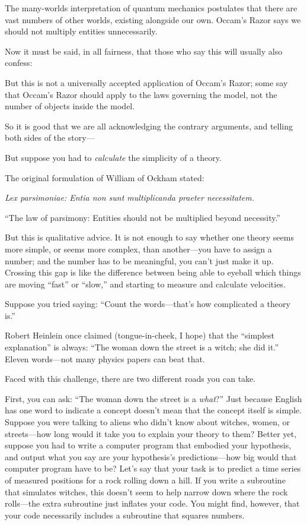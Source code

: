 {
 The many-worlds interpretation of quantum mechanics postulates
that there are vast numbers of other worlds, existing alongside our
own. Occam's Razor says we should not multiply entities
unnecessarily.}

{
 Now it must be said, in all fairness, that those who say this will
usually also confess:}

{
 But this is not a universally accepted application of
Occam's Razor; some say that Occam's
Razor should apply to the laws governing the model, not the number of
objects inside the model.}

{
 So it is good that we are all acknowledging the contrary
arguments, and telling both sides of the story---}

{
 But suppose you had to \textit{calculate} the simplicity of a
theory.}

{
 The original formulation of William of Ockham stated:}

{
 \textit{Lex parsimoniae: Entia non sunt multiplicanda praeter
necessitatem.}}

{
 ``The law of parsimony: Entities should not be
multiplied beyond necessity.''}

{
 But this is qualitative advice. It is not enough to say whether
one theory seems more simple, or seems more complex, than another---you
have to assign a number; and the number has to be meaningful, you
can't just make it up. Crossing this gap is like the
difference between being able to eyeball which things are moving
``fast'' or
``slow,'' and starting to measure
and calculate velocities.}

{
 Suppose you tried saying: ``Count the
words---that's how complicated a theory
is.''}

{
 Robert Heinlein once claimed (tongue-in-cheek, I hope) that the
``simplest explanation'' is always:
``The woman down the street is a witch; she did
it.'' Eleven words---not many physics papers can beat
that.}

{
 Faced with this challenge, there are two different roads you can
take.}

{
 First, you can ask: ``The woman down the street
is a \textit{what}?'' Just because English has one
word to indicate a concept doesn't mean that the
concept itself is simple. Suppose you were talking to aliens who
didn't know about witches, women, or streets---how long
would it take you to explain your theory to them? Better yet, suppose
you had to write a computer program that embodied your hypothesis, and
output what you say are your hypothesis's
predictions---how big would that computer program have to be?
Let's say that your task is to predict a time series of
measured positions for a rock rolling down a hill. If you write a
subroutine that simulates witches, this doesn't seem to
help narrow down where the rock rolls---the extra subroutine just
inflates your code. You might find, however, that your code necessarily
includes a subroutine that squares numbers.}


